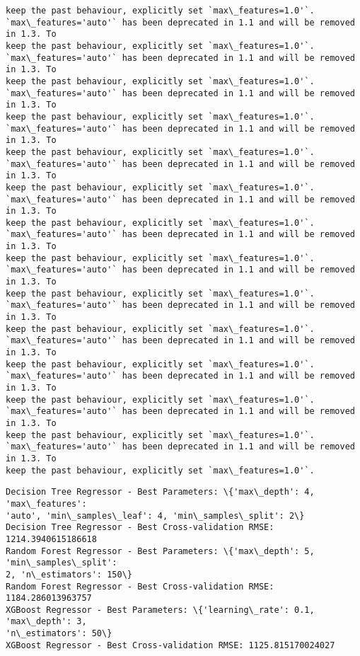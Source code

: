 \documentclass[11pt]{article}
\begin{document}
\begin{Verbatim}[commandchars=\\\{\}]
keep the past behaviour, explicitly set `max\_features=1.0'`.
`max\_features='auto'` has been deprecated in 1.1 and will be removed in 1.3. To
keep the past behaviour, explicitly set `max\_features=1.0'`.
`max\_features='auto'` has been deprecated in 1.1 and will be removed in 1.3. To
keep the past behaviour, explicitly set `max\_features=1.0'`.
`max\_features='auto'` has been deprecated in 1.1 and will be removed in 1.3. To
keep the past behaviour, explicitly set `max\_features=1.0'`.
`max\_features='auto'` has been deprecated in 1.1 and will be removed in 1.3. To
keep the past behaviour, explicitly set `max\_features=1.0'`.
`max\_features='auto'` has been deprecated in 1.1 and will be removed in 1.3. To
keep the past behaviour, explicitly set `max\_features=1.0'`.
`max\_features='auto'` has been deprecated in 1.1 and will be removed in 1.3. To
keep the past behaviour, explicitly set `max\_features=1.0'`.
`max\_features='auto'` has been deprecated in 1.1 and will be removed in 1.3. To
keep the past behaviour, explicitly set `max\_features=1.0'`.
`max\_features='auto'` has been deprecated in 1.1 and will be removed in 1.3. To
keep the past behaviour, explicitly set `max\_features=1.0'`.
`max\_features='auto'` has been deprecated in 1.1 and will be removed in 1.3. To
keep the past behaviour, explicitly set `max\_features=1.0'`.
`max\_features='auto'` has been deprecated in 1.1 and will be removed in 1.3. To
keep the past behaviour, explicitly set `max\_features=1.0'`.
`max\_features='auto'` has been deprecated in 1.1 and will be removed in 1.3. To
keep the past behaviour, explicitly set `max\_features=1.0'`.
`max\_features='auto'` has been deprecated in 1.1 and will be removed in 1.3. To
keep the past behaviour, explicitly set `max\_features=1.0'`.
`max\_features='auto'` has been deprecated in 1.1 and will be removed in 1.3. To
keep the past behaviour, explicitly set `max\_features=1.0'`.
    \end{Verbatim}

    \begin{Verbatim}[commandchars=\\\{\}]
Decision Tree Regressor - Best Parameters: \{'max\_depth': 4, 'max\_features':
'auto', 'min\_samples\_leaf': 4, 'min\_samples\_split': 2\}
Decision Tree Regressor - Best Cross-validation RMSE: 1214.3940615186618
Random Forest Regressor - Best Parameters: \{'max\_depth': 5, 'min\_samples\_split':
2, 'n\_estimators': 150\}
Random Forest Regressor - Best Cross-validation RMSE: 1184.286013963757
XGBoost Regressor - Best Parameters: \{'learning\_rate': 0.1, 'max\_depth': 3,
'n\_estimators': 50\}
XGBoost Regressor - Best Cross-validation RMSE: 1125.815170024027
    \end{Verbatim}
\end{document}
